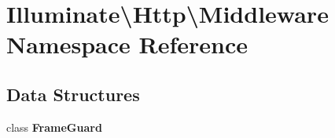 \section{Illuminate\textbackslash{}Http\textbackslash{}Middleware Namespace Reference}
\label{namespace_illuminate_1_1_http_1_1_middleware}
\subsection*{Data Structures}
\begin{DoxyCompactItemize}
\item 
class {\bf Frame\+Guard}
\end{DoxyCompactItemize}
